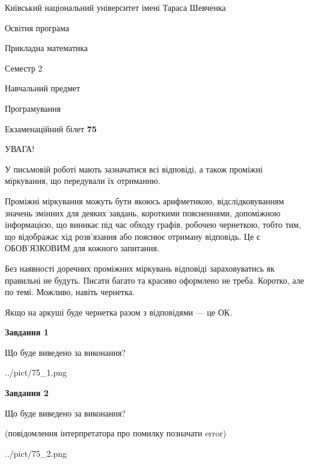 \documentclass[12pt, ukrainian]{article}
\begin{document}
{{\begin {small}\par
{ \center  Київський національний університет імені Тараса Шевченка \par}
{\parbox {5 cm}{Освітня програма \hfill}{\parbox {7 cm}{Прикладна математика\hfill}}\parbox {6 cm}{\hfill Семестр 2}}\par
{\parbox {5 cm} {Навчальний предмет \hfill}\parbox {7 cm}{Програмування \hfill}\parbox {6cm}{\hfill}\par}\vspace{-7pt} \end{small}}{\center Екзаменаційний білет \No \textbf
{ 75 }\par}}
{
\begin {large}
УВАГА!

У письмовій роботі мають зазначатися всі відповіді, а також проміжні міркування, що передували їх отриманню.

Проміжні міркування можуть бути якоюсь арифметикою, відслідковуванням зна\-чень змінних для деяких завдань,
короткими поясненнями, допоміжною інформацією, що виникає під час обходу графів, робочею чернеткою,
тобто тим, що відображає хід розв’язання або пояснює отриману відповідь.
Це є ОБОВ’ЯЗКОВИМ для кожного запитання.

Без наявності доречних проміжних міркувань відповіді зараховуватись як правиль\-ні не будуть.
Писати багато та красиво оформлено не треба. Коротко, але по темі. Можли\-во, навіть чернетка.

Якщо на аркуші буде чернетка разом з відповідями --- це ОК.

\newpage

{\begin {center}\textbf{Завдання 1}\end {center}}\par
Що буде виведено за виконання?\par
\begin{center}
	{../pict/75_1.png}
\end{center}
\newpage

{\begin {center}\textbf{Завдання 2}\end {center}}\par
Що буде виведено за виконання?\par
 (повідомлення інтерпретатора про помилку позначати error)\par
\begin{center}
	{../pict/75_2.png}
\end{center}
\newpage


\end{large}}
\end{document}
